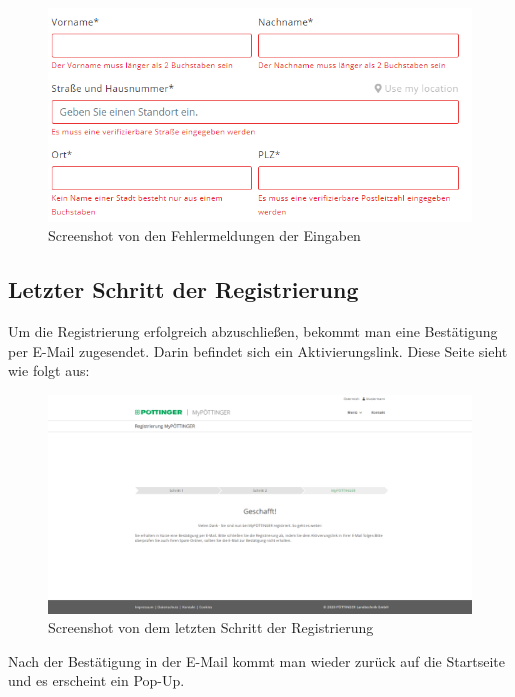 \begin{figure}[H]
	\centerline{
		\includegraphics[width=1\textwidth]{./grafiken/dateneingabe_Errors.PNG}
	}
	\vskip0pt
	\caption{Screenshot von den Fehlermeldungen der Eingaben} \label{fig:eingabeError}
\end{figure}

\subsection{Letzter Schritt der Registrierung}

Um die Registrierung erfolgreich abzuschließen, bekommt man eine Bestätigung per E-Mail zugesendet. Darin befindet sich ein Aktivierungslink. Diese Seite sieht wie folgt aus:

\begin{figure}[H]
	\centerline{
		\includegraphics[width=1\textwidth]{./grafiken/erm_register_final.png}
	}
	\vskip0pt
	\caption{Screenshot von dem letzten Schritt der Registrierung} \label{fig:step3register}
\end{figure}

Nach der Bestätigung in der E-Mail kommt man wieder zurück auf die Startseite und es erscheint ein Pop-Up.

